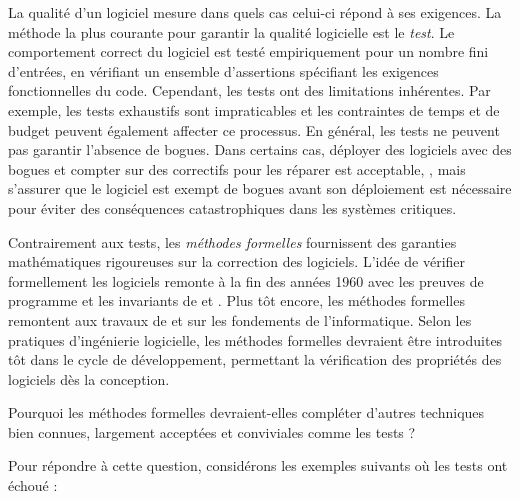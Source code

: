 {\em

La qualité d'un logiciel mesure dans quels cas celui-ci répond à ses exigences. La méthode la plus courante pour garantir la qualité logicielle est le \emph{test}. Le comportement correct du logiciel est testé empiriquement pour un nombre fini d'entrées, en vérifiant un ensemble d'assertions spécifiant les exigences fonctionnelles du code. Cependant, les tests ont des limitations inhérentes. Par exemple, les tests exhaustifs sont impraticables et les contraintes de temps et de budget peuvent également affecter ce processus. En général, les tests ne peuvent pas garantir l'absence de bogues. Dans certains cas, déployer des logiciels avec des bogues et compter sur des correctifs pour les réparer est acceptable, \cf{} , mais s'assurer que le logiciel est exempt de bogues avant son déploiement est nécessaire pour éviter des conséquences catastrophiques dans les systèmes critiques.

Contrairement aux tests, les \emph{méthodes formelles} fournissent des garanties mathématiques rigoureuses sur la correction des logiciels. L'idée de vérifier formellement les logiciels remonte à la fin des années 1960 avec les preuves de programme et les invariants de  et . Plus tôt encore, les méthodes formelles remontent aux travaux de  et  sur les fondements de l'informatique. Selon les pratiques d'ingénierie logicielle, les méthodes formelles devraient être introduites tôt dans le cycle de développement, permettant la vérification des propriétés des logiciels dès la conception.

\begin{center}
  Pourquoi les méthodes formelles devraient-elles compléter d'autres techniques bien connues, largement acceptées et conviviales comme les tests ?
\end{center}

Pour répondre à cette question, considérons les exemples suivants où les tests ont échoué :

}

